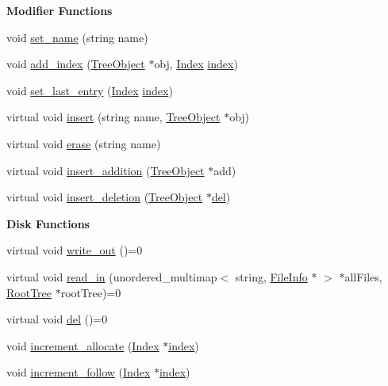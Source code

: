 \begin{Indent}{\bf Modifier Functions}\par
\begin{DoxyCompactItemize}
\item 
void \hyperlink{classTreeObject_a8ae7e42502b4652102e0b3c4c4e1671b}{set\+\_\+name} (string name)
\item 
void \hyperlink{classTreeObject_af908239ff96a0f3064d0d8aefb58381b}{add\+\_\+index} (\hyperlink{classTreeObject}{Tree\+Object} $\ast$obj, \hyperlink{structindex}{Index} \hyperlink{structindex}{index})
\item 
void \hyperlink{classTreeObject_a2ec94bc9d2647275049ddf2a70b8510e}{set\+\_\+last\+\_\+entry} (\hyperlink{structindex}{Index} \hyperlink{structindex}{index})
\item 
virtual void \hyperlink{classTreeObject_af8cc57edba9f435b52ccf33cfbbb2fc6}{insert} (string name, \hyperlink{classTreeObject}{Tree\+Object} $\ast$obj)
\item 
virtual void \hyperlink{classTreeObject_a453b5df2a9ef7c6faad259900d574ee2}{erase} (string name)
\item 
virtual void \hyperlink{classTreeObject_a41ce6080e0df5adcea4b0a76d35af885}{insert\+\_\+addition} (\hyperlink{classTreeObject}{Tree\+Object} $\ast$add)
\item 
virtual void \hyperlink{classTreeObject_afcc4b3928d2b77ff080aa229a9706215}{insert\+\_\+deletion} (\hyperlink{classTreeObject}{Tree\+Object} $\ast$\hyperlink{classTreeObject_af390b7479aa972888e594c07a85740b6}{del})
\end{DoxyCompactItemize}
\end{Indent}
\begin{Indent}{\bf Disk Functions}\par
\begin{DoxyCompactItemize}
\item 
virtual void \hyperlink{classTreeObject_a63708d61353d83e3e03597394bb7aca0}{write\+\_\+out} ()=0
\item 
virtual void \hyperlink{classTreeObject_a6b3c3585f5e7bdd6d76c6970d7784c6d}{read\+\_\+in} (unordered\+\_\+multimap$<$ string, \hyperlink{classFileInfo}{File\+Info} $\ast$ $>$ $\ast$all\+Files, \hyperlink{classRootTree}{Root\+Tree} $\ast$root\+Tree)=0
\item 
virtual void \hyperlink{classTreeObject_af390b7479aa972888e594c07a85740b6}{del} ()=0
\item 
void \hyperlink{classTreeObject_a6b6f0a5c23577748b489652013fa1728}{increment\+\_\+allocate} (\hyperlink{structindex}{Index} $\ast$\hyperlink{structindex}{index})
\item 
void \hyperlink{classTreeObject_a86fbde9e7ee245385bf7ca7a8f355bd0}{increment\+\_\+follow} (\hyperlink{structindex}{Index} $\ast$\hyperlink{structindex}{index})
\end{DoxyCompactItemize}
\end{Indent}
